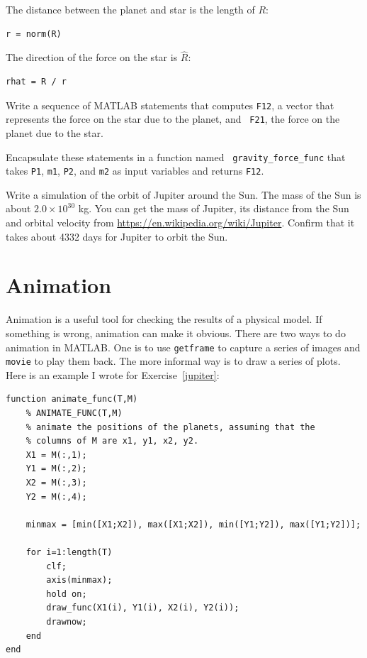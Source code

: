 \documentclass{book}
\begin{document}
The distance between the planet and star is the length of $R$:

\begin{verbatim}
r = norm(R)
\end{verbatim}

The direction of the force on the star is $\hat{R}$:

\begin{verbatim}
rhat = R / r
\end{verbatim}

\begin{ex}
Write a sequence of MATLAB statements that computes {\tt F12}, a vector
that represents the force on the star due to the planet, and {\tt
F21}, the force on the planet due to the star.
\end{ex}

\begin{ex}
Encapsulate these statements in a function named {\tt
gravity\_force\_func} that takes {\tt P1}, {\tt m1}, {\tt P2}, and
{\tt m2} as input variables and returns {\tt F12}.
\end{ex}

\begin{ex}
\label{jupiter}
Write a simulation of the orbit of Jupiter around the Sun.  The mass
of the Sun is about $2.0 \times 10^{30}$ kg.  You can get the mass of
Jupiter, its distance from the Sun and orbital velocity from
\url{https://en.wikipedia.org/wiki/Jupiter}.  Confirm that it takes
about 4332 days for Jupiter to orbit the Sun.
\end{ex}

\section{Animation}

Animation is a useful tool for checking the results of a physical
model.  If something is wrong, animation can make it obvious.
There are two ways to do animation in MATLAB.  One is to use
{\tt getframe} to capture a series of images and {\tt movie} to
play them back.
The more informal way is to draw a series of plots.
Here is an example I wrote for Exercise~\ref{jupiter}:

\begin{verbatim}
function animate_func(T,M)
    % ANIMATE_FUNC(T,M)
    % animate the positions of the planets, assuming that the
    % columns of M are x1, y1, x2, y2.
    X1 = M(:,1);
    Y1 = M(:,2);
    X2 = M(:,3);
    Y2 = M(:,4);

    minmax = [min([X1;X2]), max([X1;X2]), min([Y1;Y2]), max([Y1;Y2])];

    for i=1:length(T)
        clf;
        axis(minmax);
        hold on;
        draw_func(X1(i), Y1(i), X2(i), Y2(i));
        drawnow;
    end
end
\end{verbatim}
\end{document}
